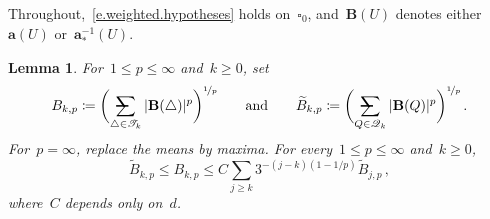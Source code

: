 \documentclass[11pt,letterpaper]{article}
\makeatletter
\numberwithin{equation}{section}
\newtheorem{lemma}[theorem]{Lemma}
\theoremstyle{definition}
\renewcommand{\a}{\mathbf{a}}
\newcommand{\nf}{\nicefrac}
\newcommand{\cu}{\square}
\newcommand{\avsum}{\mathop{\mathpalette\avsuminner\relax}\displaylimits}
\newcommand\avsuminner[2]{%
	{\sbox0{$\m@th#1\sum$}%
		\vphantom{\usebox0}%
		\ooalign{%
			\hidewidth
			\smash{\,\rule[.23em]{8.8pt}{1.1pt} \relax}%
			\hidewidth\cr
			$\m@th#1\sum$\cr
		}%
	}%
}
\makeatother
\begin{document}
Throughout,~\eqref{e.weighted.hypotheses} holds on~$\cu_0$, and~$\mathbf B(U)$ denotes either~$\a(U)$ or~$\a_*^{-1}(U)$.

\begin{lemma}
\label{l.cubical.simplicial.moments}
For~$1\leq p\leq\infty$ and~$k\geq0$, set
\begin{equation*}
	B_{k,p}\coloneqq \biggl(\avsum_{\triangle\in\mathscr T_k} |\mathbf B(\triangle)|^p\biggr)^{\nf1p} \qquad\mbox{and}\qquad \widetilde B_{k,p}\coloneqq \biggl(\avsum_{Q\in\mathscr Q_k} |\mathbf B(Q)|^p\biggr)^{\nf1p}\,.
\end{equation*}
For~$p=\infty$, replace the means by maxima. For every~$1\leq p\leq\infty$ and~$k\geq0$,
\begin{equation}
	\widetilde B_{k,p}\leq B_{k,p} \leq C\sum_{j\geq k} 3^{-(j-k)(1-1/p)}\widetilde B_{j,p}\,,
	\label{e.cubical.simplicial.moments}
\end{equation}
where~$C$ depends only on~$d$.
\end{lemma}
\end{document}
